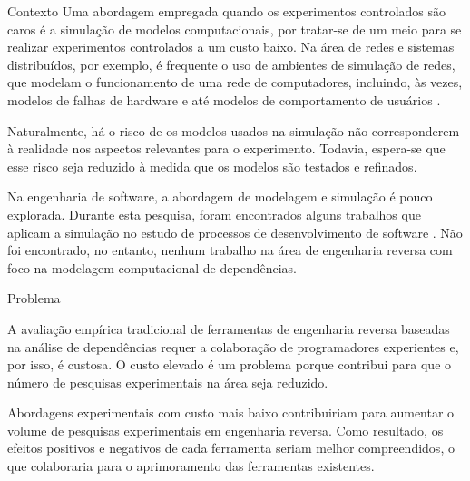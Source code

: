 \begin{section}{Contexto}
		Uma abordagem empregada quando os experimentos controlados são caros é a simulação de modelos computacionais, por tratar-se de um meio para se realizar experimentos controlados a um custo baixo. Na área de redes e sistemas distribuídos, por exemplo, é frequente o uso de ambientes de simulação de redes, que modelam o funcionamento de uma rede de computadores, incluindo, às vezes, modelos de falhas de hardware e até modelos de comportamento de usuários \cite{White2002}. 
		
		Naturalmente, há o risco de os modelos usados na simulação não corresponderem à realidade nos aspectos relevantes para o experimento. Todavia, espera-se que esse risco seja reduzido à medida que os modelos são testados e refinados.

		Na engenharia de software, a abordagem de modelagem e simulação é pouco explorada. Durante esta pesquisa, foram encontrados alguns trabalhos que aplicam a simulação no estudo de processos de desenvolvimento de software \cite{Stopford2008}. Não foi encontrado, no entanto, nenhum trabalho na área de engenharia reversa com foco na modelagem computacional de dependências.
		
\end{section}

\begin{section}{Problema}
	
	A avaliação empírica tradicional de ferramentas de engenharia reversa baseadas na análise de dependências requer a colaboração de programadores experientes e, por isso, é custosa. O custo elevado é um problema porque contribui para que o número de pesquisas experimentais na área seja reduzido. 
	
  Abordagens experimentais com custo mais baixo contribuiriam para aumentar o volume de pesquisas experimentais em engenharia reversa. Como resultado, os efeitos positivos e negativos de cada ferramenta seriam melhor compreendidos, o que colaboraria para o aprimoramento das ferramentas existentes.
	
	
\end{section}

